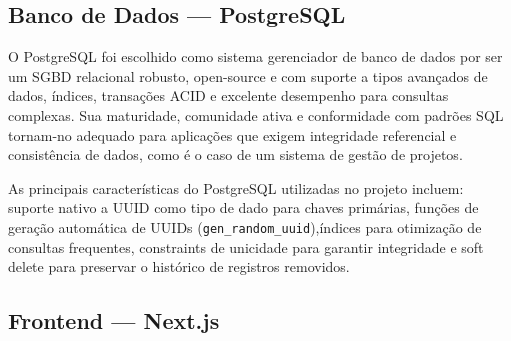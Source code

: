 \documentclass[a4paper,12pt,oneside]{article}
\begin{document}
\subsection{Banco de Dados --- PostgreSQL}

O PostgreSQL foi escolhido como sistema gerenciador de banco de dados por ser um SGBD relacional robusto, open-source e com suporte a tipos avançados de dados, índices, transações ACID e excelente desempenho para consultas complexas. Sua maturidade, comunidade ativa e conformidade com padrões SQL tornam-no adequado para aplicações que exigem integridade referencial e consistência de dados, como é o caso de um sistema de gestão de projetos.

As principais características do PostgreSQL utilizadas no projeto incluem: suporte nativo a UUID como tipo de dado para chaves primárias, funções de geração automática de UUIDs (\texttt{gen\_random\_uuid}),\linebreak índices para otimização de consultas frequentes, constraints de unicidade para garantir integridade e soft delete para preservar o histórico de registros removidos.

\subsection{Frontend --- Next.js}
\end{document}
